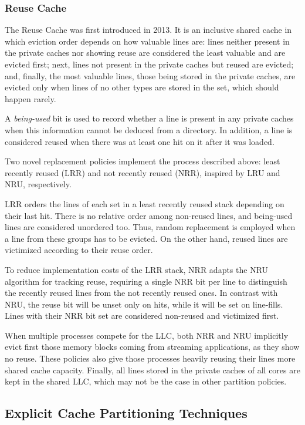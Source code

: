 \subsubsection{Reuse Cache}

The Reuse Cache was first introduced in 2013.
It is an inclusive shared cache in which eviction order depends on how valuable lines are: lines neither present in the private caches nor showing reuse are considered the least valuable and are evicted first; next, lines not present in the private caches but reused are evicted; and, finally, the most valuable lines, those being stored in the private caches, are evicted only when lines of no other types are stored in the set, which should happen rarely.

A \textit{being-used} bit is used to record whether a line is present in any private caches when this information cannot be deduced from a directory. 
In addition, a line is considered reused when there was at least one hit on it after it was loaded.

Two novel replacement policies implement the process described above: least recently reused (LRR) and not recently reused (NRR), inspired by LRU and NRU, respectively. 

LRR orders the lines of each set in a least recently reused stack depending on their last hit. 
There is no relative order among non-reused lines, and being-used lines are considered unordered too. 
Thus, random replacement is employed when a line from these groups has to be evicted. 
On the other hand, reused lines are victimized according to their reuse order. 

To reduce implementation costs of the LRR stack, NRR adapts the NRU algorithm for tracking reuse, requiring a single NRR bit per line to distinguish the recently reused lines from the not recently reused ones.
In contrast with NRU, the reuse bit will be unset only on hits, while it will be set on line-fills. 
Lines with their NRR bit set are considered non-reused and victimized first.

When multiple processes compete for the LLC, both NRR and NRU implicitly evict first those memory blocks coming from streaming applications, as they show no reuse. 
These policies also give those processes heavily reusing their lines more shared cache capacity.
Finally, all lines stored in the private caches of all cores are kept in the shared LLC, which may not be the case in other partition policies.

\subsection{Explicit Cache Partitioning Techniques}

